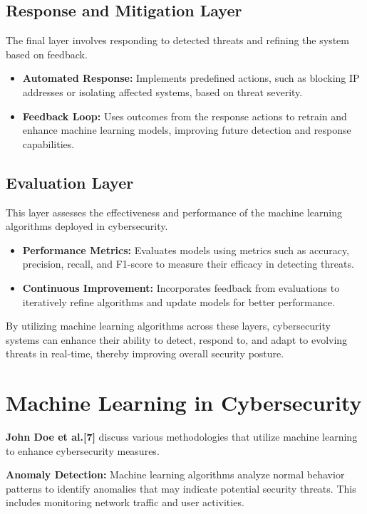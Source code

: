 \documentclass[oneside,a4paper,12pt]{report}
\begin{document}
\subsection{Response and Mitigation Layer}
The final layer involves responding to detected threats and refining the system based on feedback.
\begin{itemize}
    \item \textbf{Automated Response:} Implements predefined actions, such as blocking IP addresses or isolating affected systems, based on threat severity.
    \item \textbf{Feedback Loop:} Uses outcomes from the response actions to retrain and enhance machine learning models, improving future detection and response capabilities.
\end{itemize}

\subsection{Evaluation Layer}
This layer assesses the effectiveness and performance of the machine learning algorithms deployed in cybersecurity.
\begin{itemize}
    \item \textbf{Performance Metrics:} Evaluates models using metrics such as accuracy, precision, recall, and F1-score to measure their efficacy in detecting threats.
    \item \textbf{Continuous Improvement:} Incorporates feedback from evaluations to iteratively refine algorithms and update models for better performance.
\end{itemize}

By utilizing machine learning algorithms across these layers, cybersecurity systems can enhance their ability to detect, respond to, and adapt to evolving threats in real-time, thereby improving overall security posture.


\section{Machine Learning in Cybersecurity}
\textbf{John Doe et al.[7]} discuss various methodologies that utilize machine learning to enhance cybersecurity measures.

\vspace*{1\baselineskip}
\textbf{Anomaly Detection:} Machine learning algorithms analyze normal behavior patterns to identify anomalies that may indicate potential security threats. This includes monitoring network traffic and user activities.
\end{document}
